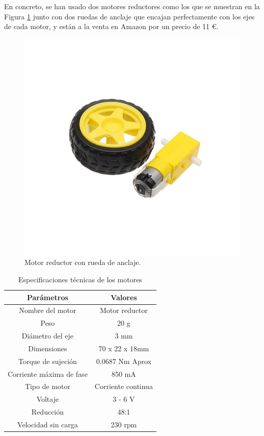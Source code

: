 En concreto, se han usado dos motores reductores como los que se muestran en la Figura \ref{fig:Motor} junto con dos ruedas de anclaje que encajan perfectamente con los ejes de cada motor, y están a la venta en Amazon por un precio de 11 \euro. 

\begin{figure}[H]
  \centering
  \includegraphics[scale=0.35]{figs/motor} %
  \caption{Motor reductor con rueda de anclaje.}
  \label{fig:Motor}
\end{figure}

\begin{table}[H]
\begin{center}
\begin{tabular}{|c|c|}
\hline
\textbf{Parámetros} & \textbf{Valores} \\
\hline

Nombre del motor & Motor reductor \\
Peso & 20 g \\  
Diámetro del eje & 3 mm \\   
Dimensiones & 70 x 22 x 18mm \\   
Torque de sujeción & 0.0687 Nm Aprox \\
Corriente máxima de fase & 850 mA \\  
Tipo de motor & Corriente continua \\   
Voltaje & 3 - 6 V \\  
Reducción & 48:1 \\ 
Velocidad sin carga & 230 rpm \\ 


\hline
\end{tabular}
\caption{Especificaciones técnicas de los motores}
\label{cuadro:ejemplo}
\end{center}
\end{table}


